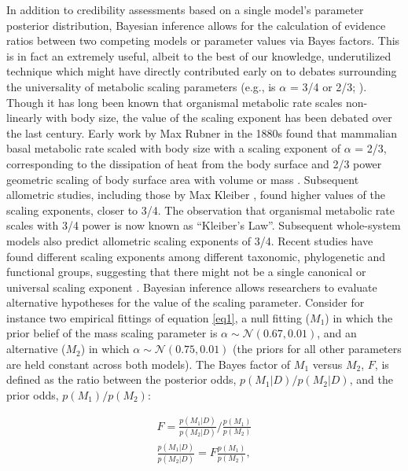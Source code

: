 \documentclass[a4paper,12pt]{article}
\begin{document}
In addition to credibility assessments based on a single model's parameter posterior distribution, Bayesian inference allows for the calculation of evidence ratios between two competing models or parameter values via Bayes factors. This is in fact an extremely useful, albeit to the best of our knowledge, underutilized technique which might have directly contributed early on to debates surrounding the universality of metabolic scaling parameters (e.g., is $\alpha$ = 3/4 or 2/3; \cite{west1999science, glazier2005biolrev, moses2008amnat}). Though it has long been known that organismal metabolic rate scales non-linearly with body size, the value of the scaling exponent has been debated over the last century. Early work by Max Rubner in the 1880s found that mammalian basal metabolic rate scaled with body size with a scaling exponent of $\alpha$ = 2/3, corresponding to the dissipation of heat from the body surface and 2/3 power geometric scaling of body surface area with volume or mass \cite{rubner1883zeibiol}. Subsequent allometric studies, including those by Max Kleiber \cite{kleiber1932hilgardia}, found higher values of the scaling exponents, closer to 3/4. The observation that organismal metabolic rate scales with 3/4 power  is now known as ``Kleiber's Law''. Subsequent whole-system models \cite{west1997science, west1999science} also predict allometric scaling exponents of 3/4. Recent studies have found different scaling exponents among different taxonomic, phylogenetic and functional groups, suggesting that there might not be a single canonical or universal scaling exponent \cite{white2003pnas, white2005jeb, delong2010pnas}. Bayesian inference allows researchers to evaluate alternative hypotheses for the value of the scaling parameter. Consider for instance two empirical fittings of equation \ref{eq1}, a null fitting ($M_1$) in which the prior belief of the mass scaling parameter is $\alpha \sim \mathcal{N}(0.67, 0.01)$, and an alternative ($M_2$) in which $\alpha \sim \mathcal{N}(0.75, 0.01)$ (the priors for all other parameters are held constant across both models). The Bayes factor of $M_1$ versus $M_2$, $F$, is defined as the ratio between the posterior odds, $p(M_1 | D)/p(M_2 | D)$, and the prior odds, $p(M_1)/p(M_2)$:

\begin{equation}
\begin{split}
  F = \frac{p(M_1 | D)}{p(M_2 | D)} / \frac{p(M_1)}{p(M_2)} \\
  \frac{p(M_1 | D)}{p(M_2 | D)} = F \frac{p(M_1)}{p(M_2)},
  \label{eq5}
\end{split}
\end{equation}
\end{document}
